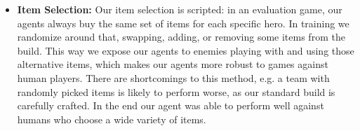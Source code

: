 \documentclass[ocean-paper.tex]{subfiles}
\begin{document}
\begin{itemize}
In \autoref{sec:multihero}, we see that training with additional heroes causes only a modest slowdown to training despite the extra heroes having new abilities and strategies which interact in complex ways.
\item \textbf{Item Selection: }
Our item selection is scripted: in an evaluation game, our agents always buy the same set of items for each specific hero.
In training we randomize around that, swapping, adding, or removing some items from the build.
This way we expose our agents to enemies playing with and using those alternative items, which makes our agents more robust to games against human players.
There are shortcomings to this method, e.g. a team with randomly picked items is likely to perform worse, as our standard build is carefully crafted.
In the end our agent was able to perform well against humans who choose a wide variety of items.
\end{itemize}
\end{document}
